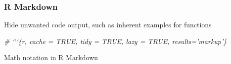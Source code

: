 \documentclass[10,portrait]{article}
\newenvironment{Shaded}{\begin{snugshade}}{\end{snugshade}}
\newcommand{\DecValTok}[1]{\textcolor[rgb]{0.00,0.00,0.81}{#1}}
\newcommand{\StringTok}[1]{\textcolor[rgb]{0.31,0.60,0.02}{#1}}
\newcommand{\CommentTok}[1]{\textcolor[rgb]{0.56,0.35,0.01}{\textit{#1}}}
\newcommand{\OperatorTok}[1]{\textcolor[rgb]{0.81,0.36,0.00}{\textbf{#1}}}
\newcommand{\NormalTok}[1]{#1}
\begin{document}
\subsubsection{R Markdown}\label{r-markdown}

Hide unwanted code output, such as inherent examples for functions

\begin{Shaded}
\begin{Highlighting}[]
\CommentTok{# ```\{r, cache = TRUE, tidy = TRUE, lazy = TRUE, results='markup'\}}
\end{Highlighting}
\end{Shaded}

Math notation in R Markdown

\begin{Shaded}
\end{Shaded}
\end{document}
